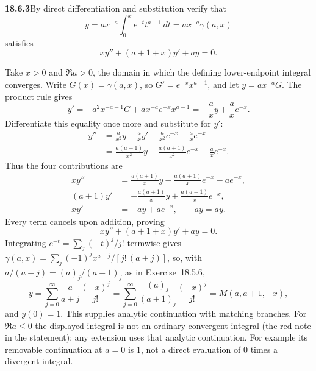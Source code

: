 \par\bigskip
\noindent\textbf{18.6.3}\quad By direct differentiation and
substitution verify that
\[
y=ax^{-a}\int_{0}^{x}e^{-t}t^{a-1}\,dt=ax^{-a}\gamma(a,x)
\]
satisfies
\[
xy''+(a+1+x)y'+ay=0.
\]
\par\nobreak
\solution
Take $x>0$ and $\Re a>0$, the domain in which the defining
lower-endpoint integral converges.  Write
$G(x)=\gamma(a,x)$, so $G'=e^{-x}x^{a-1}$, and let
$y=ax^{-a}G$.  The product rule gives
\[
y'=-a^2x^{-a-1}G+ax^{-a}e^{-x}x^{a-1}
 =-\frac ax y+\frac a x e^{-x}.
\]
Differentiate this equality once more and substitute for $y'$:
\begin{align*}
y''&=\frac a{x^2}y-\frac ax y'
       -\frac a{x^2}e^{-x}-\frac ax e^{-x}\\
 &=\frac{a(a+1)}{x^2}y
       -\frac{a(a+1)}{x^2}e^{-x}-\frac ax e^{-x}.
\end{align*}
Thus the four contributions are
\begin{align*}
xy''&=\frac{a(a+1)}x y-\frac{a(a+1)}x e^{-x}-ae^{-x},\\
(a+1)y'&=-\frac{a(a+1)}x y+\frac{a(a+1)}x e^{-x},\\
xy'&=-ay+ae^{-x},\qquad ay=ay.
\end{align*}
Every term cancels upon addition, proving
\[
\boxed{xy''+(a+1+x)y'+ay=0}.
\]
Integrating $e^{-t}=\sum_j(-t)^j/j!$ termwise gives
$\gamma(a,x)=\sum_j(-1)^jx^{a+j}/[j!\,(a+j)]$, so, with
$a/(a+j)=(a)_j/(a+1)_j$ as in Exercise~18.5.6,
\[
y=\sum_{j=0}^\infty\frac{a}{a+j}\frac{(-x)^j}{j!}
 =\sum_{j=0}^\infty\frac{(a)_j}{(a+1)_j}\frac{(-x)^j}{j!}
 =M(a,a+1,-x),
\]
and $y(0)=1$.  This supplies analytic continuation with matching
branches.  For $\Re a\le0$ the displayed integral is not an
ordinary convergent integral (the red note in the statement); any
extension uses that analytic continuation.  For example its
removable continuation at $a=0$ is $1$, not a direct evaluation of
$0$ times a divergent integral.

